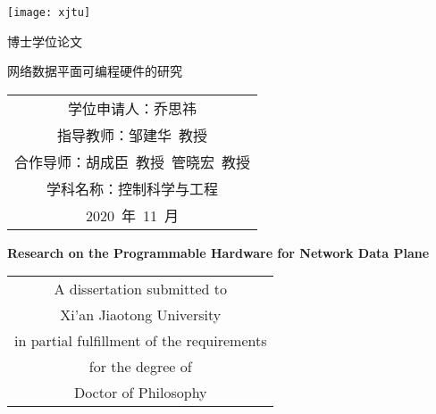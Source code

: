 
\begin{titlepage}
	\begin{center}
		\begin{figure*}[!ht]\vspace{5em}
			\centering
			\texttt{[image: xjtu]}
		\end{figure*}
		
		\vspace{1.5em}
		\begin{center} { 博士学位论文} \end{center}
		
		\vspace{8.5em}
		\begin{center} {\sanhao\boldsong 网络数据平面可编程硬件的研究}\end{center}
		
		\vspace{15em}
		{\sanhao
			\begin{center} \renewcommand{\arraystretch}{1.5}
				\begin{tabular}{c}
					学位申请人：乔思祎 \\
					指导教师：邹建华~教授 \\
					合作导师：胡成臣~教授~管晓宏~教授\\
					学科名称：控制科学与工程 \\
					2020~年~11~月 \\
				\end{tabular} \renewcommand{\arraystretch}{1}
			\end{center} 
		}
	\end{center}
	\clearpage{\pagestyle{empty}\cleardoublepage}
	
	\newpage\thispagestyle{empty}
	\begin{center}
		\parbox[t][0.7cm][t]{\textwidth}{}
		
		\begin{center}{\sanhao\bfseries Research on the Programmable Hardware for Network Data Plane}\end{center}
		
		\vspace{4.7cm}
		{\sanhao
			\begin{center} \renewcommand{\arraystretch}{1.4}
				\begin{tabular}{c}
					A dissertation submitted to  \\
					Xi'an Jiaotong University \\
					in partial fulfillment of the requirements \\
					for the degree of \\
					Doctor of Philosophy \\
				\end{tabular} \renewcommand{\arraystretch}{1}
			\end{center} 
		}
		

\end{center}
\end{titlepage}
